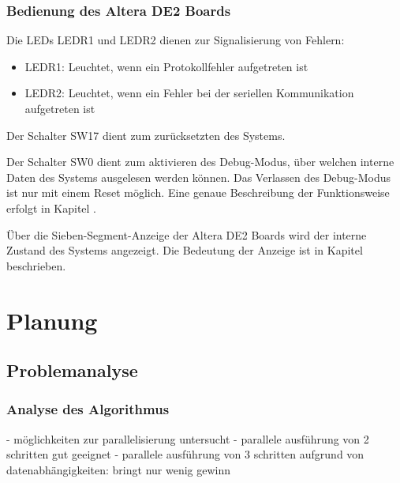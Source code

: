 \documentclass
[ 12pt,
  parskip=half %
]{scrreprt}
\begin{document}
\subsection{Bedienung des Altera DE2 Boards}

Die LEDs LEDR1 und LEDR2 dienen zur Signalisierung von Fehlern:
\begin{itemize}
	\item LEDR1: Leuchtet, wenn ein Protokollfehler aufgetreten ist
	\item LEDR2: Leuchtet, wenn ein Fehler bei der seriellen Kommunikation aufgetreten ist
\end{itemize}

Der Schalter SW17 dient zum zurücksetzten des Systems.

Der Schalter SW0 dient zum aktivieren des Debug-Modus, über welchen interne Daten des Systems ausgelesen werden können. Das Verlassen des Debug-Modus ist nur mit einem Reset möglich. Eine genaue Beschreibung der Funktionsweise erfolgt in Kapitel .
 
Über die Sieben-Segment-Anzeige der Altera DE2 Boards wird der interne Zustand des Systems angezeigt. Die Bedeutung der Anzeige ist in Kapitel  beschrieben.

\chapter{Planung}

\section{Problemanalyse}

\subsection{Analyse des Algorithmus}

- möglichkeiten zur parallelisierung untersucht
- parallele ausführung von 2 schritten gut geeignet
- parallele ausführung von 3 schritten aufgrund von datenabhängigkeiten: bringt nur wenig gewinn
\end{document}
